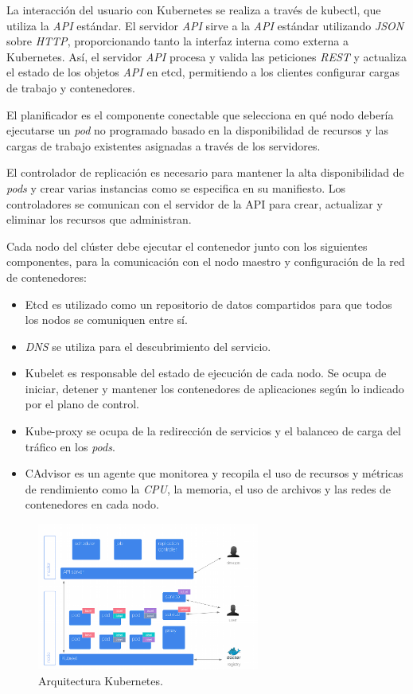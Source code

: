 La interacción del usuario con Kubernetes se realiza a través de kubectl, que utiliza la \textit{API} estándar. El servidor \textit{API} sirve a la \textit{API} estándar utilizando \textit{JSON} sobre \textit{HTTP}, proporcionando tanto la interfaz interna como externa a Kubernetes. Así, el servidor \textit{API} procesa y valida las peticiones \textit{REST} y actualiza el estado de los objetos \textit{API} en etcd, permitiendo a los clientes configurar cargas de trabajo y contenedores. 

El planificador es el componente conectable que selecciona en qué nodo debería ejecutarse un \textit{pod} no programado basado en la disponibilidad de recursos y las cargas de trabajo existentes asignadas a través de los servidores.

El controlador de replicación es necesario para mantener la alta disponibilidad de \textit{pods} y crear varias instancias como se especifica en su manifiesto. Los controladores se comunican con el servidor de la API para crear, actualizar y eliminar los recursos que administran. 

Cada nodo del clúster debe ejecutar el contenedor junto con los siguientes componentes, para la comunicación con el nodo maestro y configuración de la red de contenedores:
\begin{itemize}
\item Etcd es utilizado como un repositorio de datos compartidos para que todos los nodos se comuniquen entre sí.
\item \textit{DNS} se utiliza para el descubrimiento del servicio.
\item Kubelet es responsable del estado de ejecución de cada nodo. Se ocupa de iniciar, detener y mantener los contenedores de aplicaciones según lo indicado por el plano de control.
\item Kube-proxy se ocupa de la redirección de servicios y el balanceo de carga del tráfico en los \textit{pods}.
\item CAdvisor es un agente que monitorea y recopila el uso de recursos y métricas de rendimiento como la \textit{CPU}, la memoria, el uso de archivos y las redes de contenedores en cada nodo.
\end{itemize}

\begin{figure}[H]
\centering
\includegraphics[width=0.65\textwidth]{images/figures/kubernetesarchitecture.png}
\caption{Arquitectura Kubernetes.\footnotemark}
\end{figure}

